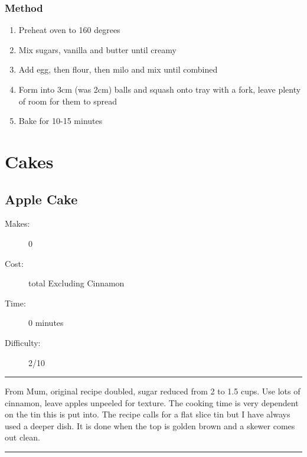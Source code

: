\documentclass[]{article}
\begin{document}
\subsubsection*{\Large Method}
\begin{enumerate}[font=\huge\color{accent}]
	\item Preheat oven to 160 degrees
	\item Mix sugars, vanilla and butter until creamy
	\item Add egg, then flour, then milo and mix until combined
	\item Form into 3cm (was 2cm) balls and squash onto tray with a fork, leave plenty of room for them to spread
	\item Bake for 10-15 minutes
\end{enumerate}
\newpage
{}
\section*{\center\Huge\color{accent}Cakes}
\label{cat:Cakes}
\label{rec:Apple Cake}
\subsection*{\center\huge Apple Cake}
\begin{description}
\item[Makes:] 0 
\item[Cost:]  total Excluding Cinnamon
\item[Time:] 0 minutes
\item[Difficulty:] 2/10
\end{description}
\vspace{0.2cm}\hrule\vspace{0.5cm}
\begin{adjustwidth}{0.5 cm}{0.5 cm}

From Mum, original recipe doubled, sugar reduced from 2 to 1.5 cups. Use lots of cinnamon, leave apples unpeeled for texture. The cooking time is very dependent on the tin this is put into. The recipe calls for a flat slice tin but I have always used a deeper dish. It is done when the top is golden brown and a skewer comes out clean. \hfill\color{accent}{\Large\faVimeoSquare\hspace{0.1cm}\faTruck\hspace{0.1cm}}\color{black}

\end{adjustwidth}
\vspace{0.5cm}\hrule
\end{document}
